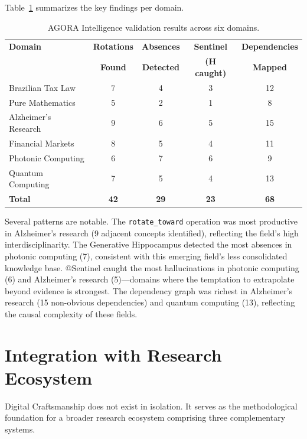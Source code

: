 \documentclass[11pt,a4paper]{article}
\begin{document}
Table~\ref{tab:validation} summarizes the key findings per domain.

\begin{table}[ht]
\centering
\caption{AGORA Intelligence validation results across six domains.}
\label{tab:validation}
\small
\begin{tabular}{@{}lcccc@{}}
\toprule
\textbf{Domain} & \textbf{Rotations} & \textbf{Absences} & \textbf{Sentinel} & \textbf{Dependencies} \\
 & \textbf{Found} & \textbf{Detected} & \textbf{(H caught)} & \textbf{Mapped} \\
\midrule
Brazilian Tax Law & 7 & 4 & 3 & 12 \\
Pure Mathematics & 5 & 2 & 1 & 8 \\
Alzheimer's Research & 9 & 6 & 5 & 15 \\
Financial Markets & 8 & 5 & 4 & 11 \\
Photonic Computing & 6 & 7 & 6 & 9 \\
Quantum Computing & 7 & 5 & 4 & 13 \\
\midrule
\textbf{Total} & \textbf{42} & \textbf{29} & \textbf{23} & \textbf{68} \\
\bottomrule
\end{tabular}
\end{table}

Several patterns are notable. The \texttt{rotate\_toward} operation was most productive in Alzheimer's research (9 adjacent concepts identified), reflecting the field's high interdisciplinarity. The Generative Hippocampus detected the most absences in photonic computing (7), consistent with this emerging field's less consolidated knowledge base. @Sentinel caught the most hallucinations in photonic computing (6) and Alzheimer's research (5)---domains where the temptation to extrapolate beyond evidence is strongest. The dependency graph was richest in Alzheimer's research (15 non-obvious dependencies) and quantum computing (13), reflecting the causal complexity of these fields.

\section{Integration with Research Ecosystem}
\label{sec:ecosystem}

Digital Craftsmanship does not exist in isolation. It serves as the methodological foundation for a broader research ecosystem comprising three complementary systems.
\end{document}
